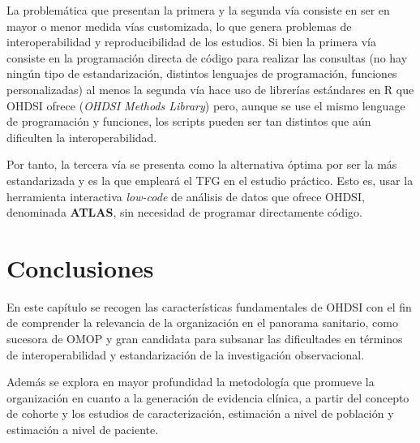La problemática que presentan la primera y la segunda vía consiste en ser en mayor o menor medida vías customizada, lo que genera problemas de interoperabilidad y reproducibilidad de los estudios. Si bien la primera vía consiste en la programación directa de código para realizar las consultas  (no hay ningún tipo de estandarización, distintos lenguajes de programación, funciones personalizadas) al menos la segunda vía hace uso de librerías estándares en R que OHDSI ofrece (\textit{OHDSI Methods Library}) pero, aunque se use el mismo lenguage de programación y funciones, los scripts pueden ser tan distintos que aún dificulten la interoperabilidad.

Por tanto, la tercera vía se presenta como la alternativa óptima por ser la más estandarizada y es la que empleará el TFG en el estudio práctico. Esto es, usar la herramienta interactiva \textit{low-code} de análisis de datos que ofrece OHDSI, denominada \textbf{ATLAS}, sin necesidad de programar directamente código.

\section{Conclusiones} \label{sec:05conclusion}

En este capítulo se recogen las características fundamentales de OHDSI con el fin de comprender la relevancia de la organización en el panorama sanitario, como sucesora de OMOP y gran candidata para subsanar las dificultades en términos de interoperabilidad y estandarización de la investigación observacional.

Además se explora en mayor profundidad la metodología que promueve la organización en cuanto a la generación de evidencia clínica, a partir del concepto de cohorte y los estudios de caracterización, estimación a nivel de población y estimación a nivel de paciente.